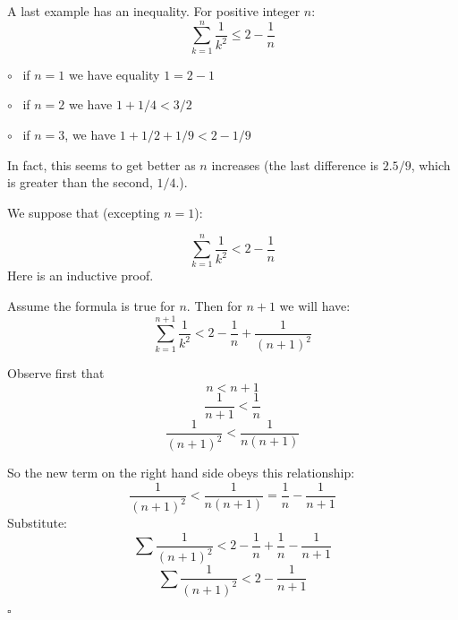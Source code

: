 \documentclass[11pt, oneside]{article}
\begin{document}
A last example has an inequality.  For positive integer $n$:
\[ \sum_{k=1}^{n} \frac{1}{k^2} \le 2 - \frac{1}{n} \]

$\circ$ \ if $n=1$ we have equality $1 = 2 - 1$

$\circ$ \ if $n=2$ we have $1 + 1/4 < 3/2$

$\circ$ \ if $n = 3$, we have $1 + 1/2 + 1/9 < 2 - 1/9$ 

In fact, this seems to get better as $n$ increases (the last difference is $2.5/9$, which is greater than the second, $1/4$.).  

We suppose that (excepting $n=1$):

\[ \sum_{k=1}^{n} \frac{1}{k^2} < 2 - \frac{1}{n} \]
Here is an inductive proof.

Assume the formula is true for $n$.  Then for $n+1$ we will have:
\[ \sum_{k=1}^{n+1} \frac{1}{k^2} < 2 - \frac{1}{n} + \frac{1}{(n+1)^2}  \]

Observe first that
\[ n < n + 1 \]
\[ \frac{1}{n+1} < \frac{1}{n} \]
\[ \frac{1}{(n + 1)^2} < \frac{1}{n(n+1)} \]

So the new term on the right hand side obeys this relationship:
\[ \frac{1}{(n + 1)^2} <  \frac{1}{n(n+1)} = \frac{1}{n} - \frac{1}{n + 1} \]
Substitute:
\[ \sum \frac{1}{(n+1)^2} < 2 - \frac{1}{n} + \frac{1}{n} - \frac{1}{n + 1} \]
\[ \sum \frac{1}{(n+1)^2} < 2 - \frac{1}{n + 1} \]

$\square$
\end{document}

